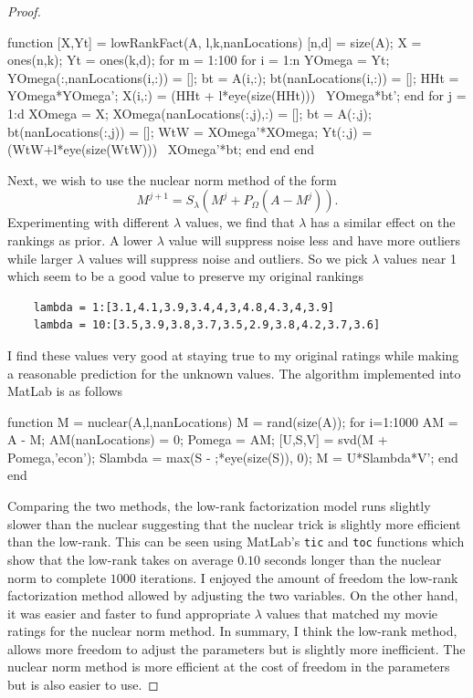 \documentclass[12pt]{report}
\begin{document}
\begin{problem}
\begin{proof}
\begin{python}
    function [X,Yt] = lowRankFact(A, l,k,nanLocations)
        [n,d] = size(A);
        X = ones(n,k);
        Yt = ones(k,d);
        for m = 1:100
            for i = 1:n
                YOmega = Yt;
                YOmega(:,nanLocations(i,:)) = [];
                bt = A(i,:);
                bt(nanLocations(i,:)) = [];
                HHt = YOmega*YOmega';
                X(i,:) = (HHt + l*eye(size(HHt))) \ YOmega*bt';
            end
            for j = 1:d
                XOmega = X;
                XOmega(nanLocations(:,j),:) = [];
                bt = A(:,j);
                bt(nanLocations(:,j)) = [];
                WtW = XOmega'*XOmega; %
                Yt(:,j) = (WtW+l*eye(size(WtW))) \ XOmega'*bt; %
            end
        end
    end
\end{python}


\noindent
Next, we wish to use the nuclear norm method of the form
\[
    M^{j+1} = S_\lambda (M^j + P_\Omega(A - M^j)).
\]
Experimenting with different $\lambda$ values, we find that $\lambda$ has a similar effect on the rankings as prior. A lower $\lambda$ value will suppress noise less and have more outliers while larger $\lambda$ values will suppress noise and outliers. So we pick $\lambda$ values near 1 which seem to be a good value to preserve my original rankings
\begin{verbatim}
    lambda = 1:[3.1,4.1,3.9,3.4,4,3,4.8,4.3,4,3.9]
    lambda = 10:[3.5,3.9,3.8,3.7,3.5,2.9,3.8,4.2,3.7,3.6]
\end{verbatim}
I find these values very good at staying true to my original ratings while making a reasonable prediction for the unknown values. The algorithm implemented into MatLab is as follows
\begin{python}
    function M = nuclear(A,l,nanLocations)
    M = rand(size(A));
   for i=1:1000
        AM = A - M;
        AM(nanLocations) = 0;
        Pomega = AM;
        [U,S,V] = svd(M + Pomega,'econ'); %
        Slambda = max(S - ;*eye(size(S)), 0);
        M = U*Slambda*V';
    end
end
\end{python}

\noindent 
Comparing the two methods, the low-rank factorization model runs slightly slower than the nuclear suggesting that the nuclear trick is slightly more efficient than the low-rank. This can be seen using MatLab's \verb+tic+ and \verb+toc+ functions which show that the low-rank takes on average $0.10$ seconds longer than the nuclear norm to complete $1000$ iterations. I enjoyed the amount of freedom the low-rank factorization method allowed by adjusting the two variables. On the other hand, it was easier and faster to fund appropriate $\lambda$ values that matched my movie ratings for the nuclear norm method. In summary, I think the low-rank method, allows more freedom to adjust the parameters but is slightly more inefficient. The nuclear norm method is more efficient at the cost of freedom in the parameters but is also easier to use. 


\end{proof}
\end{problem}
\end{document}
